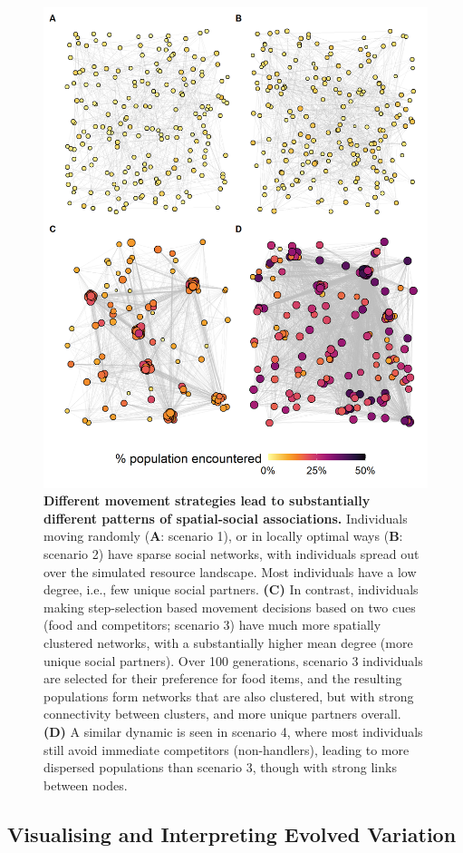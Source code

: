 \begin{interludeenv}
\begin{figure}[!h]
    \centering
    \includegraphics[width=0.75\linewidth]{figures/introduction/fig_networks.png}
    \caption{
        \textbf{Different movement strategies lead to substantially different patterns of spatial-social associations.}
        Individuals moving randomly (\textbf{A}: scenario 1), or in locally optimal ways (\textbf{B}: scenario 2) have sparse social networks, with individuals spread out over the simulated resource landscape.
        Most individuals have a low degree, i.e., few unique social partners.
        \textbf{(C)} In contrast, individuals making step-selection based movement decisions based on two cues (food and competitors; scenario 3) have much more spatially clustered networks, with a substantially higher mean degree (more unique social partners).
        Over 100 generations, scenario 3 individuals are selected for their preference for food items, and the resulting populations form networks that are also clustered, but with strong connectivity between clusters, and more unique partners overall.
        \textbf{(D)} A similar dynamic is seen in scenario 4, where most individuals still avoid immediate competitors (non-handlers), leading to more dispersed populations than scenario 3, though with strong links between nodes.
    }
    \label{fig:demo_networks}
  \end{figure}

\subsection*{Visualising and Interpreting Evolved Variation}


\end{interludeenv}

